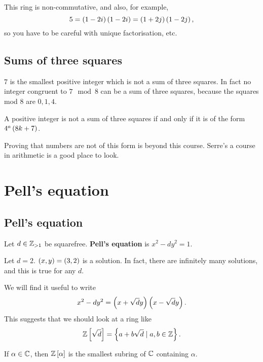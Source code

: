 \begin{note*}
This ring is non-commutative, and also, for example,
$$ 5 = \br{1 - 2i}\br{1 - 2i} = \br{1 + 2j}\br{1 - 2j}, $$
so you have to be careful with unique factorisation, etc.
\end{note*}

\subsection{Sums of three squares}

$ 7 $ is the smallest positive integer which is not a sum of three squares. In fact no integer congruent to $ 7 \mod 8 $ can be a sum of three squares, because the squares mod $ 8 $ are $ 0, 1, 4 $.

\begin{theorem}
A positive integer is not a sum of three squares if and only if it is of the form $ 4^a\br{8k + 7} $.
\end{theorem}

Proving that numbers are not of this form is beyond this course. Serre's a course in arithmetic is a good place to look.

\pagebreak

\section{Pell's equation}

\subsection{Pell's equation}

Let $ d \in \mathbb{Z}_{> 1} $ be squarefree. \textbf{Pell's equation} is $ x^2 - dy^2 = 1 $.

\begin{example*}
Let $ d = 2 $. $ \br{x, y} = \br{3, 2} $ is a solution. In fact, there are infinitely many solutions, and this is true for any $ d $.
\end{example*}

We will find it useful to write
$$ x^2 - dy^2 = \br{x + \sqrt{d}y}\br{x - \sqrt{d}y}. $$
This suggests that we should look at a ring like
$$ \Z\sbr{\sqrt{d}} = \cbr{a + b\sqrt{d} \mid a, b \in \Z}. $$

\begin{definition}
If $ \alpha \in \mathbb{C} $, then $ \Z\sbr{\alpha} $ is the smallest subring of $ \mathbb{C} $ containing $ \alpha $.
\end{definition}

